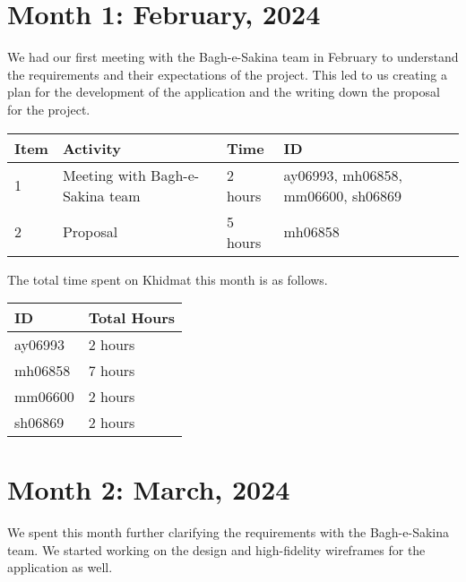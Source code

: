 \documentclass{article}
\begin{document}

\newpage %
\section*{Month 1: February, 2024}

We had our first meeting with the Bagh-e-Sakina team in February to understand the requirements and their expectations of the project. This led to us creating a plan for the development of the application and the writing down the proposal for the project.

\vspace{1em}

\noindent \begin{tabular}{|l|l|l|l|}
  \hline
  Item & Activity     & Time  & ID \\ \hline
  1    & Meeting with Bagh-e-Sakina team & 2 hours  & ay06993, mh06858, mm06600, sh06869 \\ \hline
  2    & Proposal     & 5 hours & mh06858 \\ \hline
\end{tabular}

\vspace{1em}

\noindent The total time spent on Khidmat this month is as follows.

\vspace{1em}

\noindent \begin{tabular}{|l|l|}
  \hline
  ID      & Total Hours \\ \hline
  ay06993 & 2 hours     \\ \hline
  mh06858 & 7 hours     \\ \hline
  mm06600 & 2 hours     \\ \hline
  sh06869 & 2 hours     \\ \hline
\end{tabular}

\newpage %
\section*{Month 2: March, 2024}

We spent this month further clarifying the requirements with the Bagh-e-Sakina team. We started working on the design and high-fidelity wireframes for the application as well. 
\end{document}
